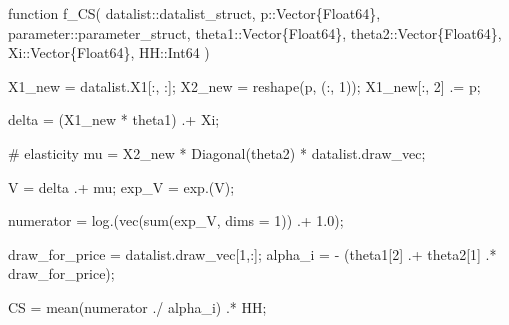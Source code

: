 \documentclass[
  letterpaper,
  DIV=11,
  numbers=noendperiod]{scrreprt}
\newenvironment{Shaded}{\begin{snugshade}}{\end{snugshade}}
\newcommand{\CommentTok}[1]{\textcolor[rgb]{0.37,0.37,0.37}{#1}}
\newcommand{\DataTypeTok}[1]{\textcolor[rgb]{0.68,0.00,0.00}{#1}}
\newcommand{\FloatTok}[1]{\textcolor[rgb]{0.68,0.00,0.00}{#1}}
\newcommand{\FunctionTok}[1]{\textcolor[rgb]{0.28,0.35,0.67}{#1}}
\newcommand{\KeywordTok}[1]{\textcolor[rgb]{0.00,0.23,0.31}{#1}}
\newcommand{\NormalTok}[1]{\textcolor[rgb]{0.00,0.23,0.31}{#1}}
\newcommand{\OperatorTok}[1]{\textcolor[rgb]{0.37,0.37,0.37}{#1}}
\begin{document}
\begin{Shaded}
\begin{Highlighting}[]
\KeywordTok{function} \FunctionTok{f\_CS}\NormalTok{(}
\NormalTok{        datalist}\OperatorTok{::}\DataTypeTok{datalist\_struct}\NormalTok{,}
\NormalTok{        p}\OperatorTok{::}\DataTypeTok{Vector\{Float64\}}\NormalTok{,}
\NormalTok{        parameter}\OperatorTok{::}\DataTypeTok{parameter\_struct}\NormalTok{,}
\NormalTok{        theta1}\OperatorTok{::}\DataTypeTok{Vector\{Float64\}}\NormalTok{,}
\NormalTok{        theta2}\OperatorTok{::}\DataTypeTok{Vector\{Float64\}}\NormalTok{,}
\NormalTok{        Xi}\OperatorTok{::}\DataTypeTok{Vector\{Float64\}}\NormalTok{,}
\NormalTok{        HH}\OperatorTok{::}\DataTypeTok{Int64}
\NormalTok{    )}
    
\NormalTok{    X1\_new }\OperatorTok{=}\NormalTok{ datalist.X1[}\OperatorTok{:}\NormalTok{, }\OperatorTok{:}\NormalTok{];}
\NormalTok{    X2\_new }\OperatorTok{=} \FunctionTok{reshape}\NormalTok{(p, (}\OperatorTok{:}\NormalTok{, }\FloatTok{1}\NormalTok{));}
\NormalTok{    X1\_new[}\OperatorTok{:}\NormalTok{, }\FloatTok{2}\NormalTok{] }\OperatorTok{.=}\NormalTok{ p;}
    
\NormalTok{    delta }\OperatorTok{=}\NormalTok{ (X1\_new }\OperatorTok{*}\NormalTok{ theta1) }\OperatorTok{.+}\NormalTok{ Xi;}
    
    \CommentTok{\# elasticity}
\NormalTok{    mu }\OperatorTok{=}\NormalTok{ X2\_new }\OperatorTok{*} \FunctionTok{Diagonal}\NormalTok{(theta2) }\OperatorTok{*}\NormalTok{ datalist.draw\_vec;}
    
\NormalTok{    V }\OperatorTok{=}\NormalTok{ delta }\OperatorTok{.+}\NormalTok{ mu;}
\NormalTok{    exp\_V }\OperatorTok{=} \FunctionTok{exp}\NormalTok{.(V);}
    
\NormalTok{    numerator }\OperatorTok{=} \FunctionTok{log}\NormalTok{.(}\FunctionTok{vec}\NormalTok{(}\FunctionTok{sum}\NormalTok{(exp\_V, dims }\OperatorTok{=} \FloatTok{1}\NormalTok{)) }\OperatorTok{.+} \FloatTok{1.0}\NormalTok{);}
    
\NormalTok{    draw\_for\_price }\OperatorTok{=}\NormalTok{ datalist.draw\_vec[}\FloatTok{1}\NormalTok{,}\OperatorTok{:}\NormalTok{];}
\NormalTok{    alpha\_i }\OperatorTok{=} \OperatorTok{{-}}\NormalTok{ (theta1[}\FloatTok{2}\NormalTok{] }\OperatorTok{.+}\NormalTok{ theta2[}\FloatTok{1}\NormalTok{] }\OperatorTok{.*}\NormalTok{ draw\_for\_price);}
    
\NormalTok{    CS }\OperatorTok{=} \FunctionTok{mean}\NormalTok{(numerator }\OperatorTok{./}\NormalTok{ alpha\_i) }\OperatorTok{.*}\NormalTok{ HH;}


\end{Highlighting}
\end{Shaded}
\end{document}
